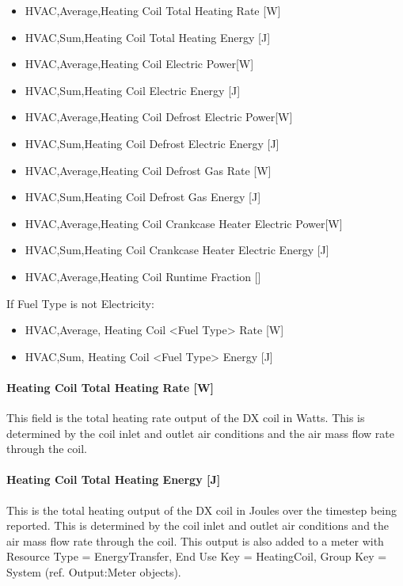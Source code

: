 \begin{itemize}
\item
  HVAC,Average,Heating Coil Total Heating Rate {[}W{]}
\item
  HVAC,Sum,Heating Coil Total Heating Energy {[}J{]}
\item
  HVAC,Average,Heating Coil Electric Power{[}W{]}
\item
  HVAC,Sum,Heating Coil Electric Energy {[}J{]}
\item
  HVAC,Average,Heating Coil Defrost Electric Power{[}W{]}
\item
  HVAC,Sum,Heating Coil Defrost Electric Energy {[}J{]}
\item
  HVAC,Average,Heating Coil Defrost Gas Rate {[}W{]}
\item
  HVAC,Sum,Heating Coil Defrost Gas Energy {[}J{]}
\item
  HVAC,Average,Heating Coil Crankcase Heater Electric Power{[}W{]}
\item
  HVAC,Sum,Heating Coil Crankcase Heater Electric Energy {[}J{]}
\item
  HVAC,Average,Heating Coil Runtime Fraction {[]}
\end{itemize}

If Fuel Type is not Electricity:

\begin{itemize}
\item
  HVAC,Average, Heating Coil \textless{}Fuel Type\textgreater{} Rate {[}W{]}
\item
  HVAC,Sum, Heating Coil \textless{}Fuel Type\textgreater{} Energy {[}J{]}
\end{itemize}

\paragraph{Heating Coil Total Heating Rate {[}W{]}}\label{heating-coil-total-heating-rate-w-3}

This field is the total heating rate output of the DX coil in Watts. This is determined by the coil inlet and outlet air conditions and the air mass flow rate through the coil.

\paragraph{Heating Coil Total Heating Energy {[}J{]}}\label{heating-coil-total-heating-energy-j-3}

This is the total heating output of the DX coil in Joules over the timestep being reported. This is determined by the coil inlet and outlet air conditions and the air mass flow rate through the coil. This output is also added to a meter with Resource Type = EnergyTransfer, End Use Key = HeatingCoil, Group Key = System (ref. Output:Meter objects).

